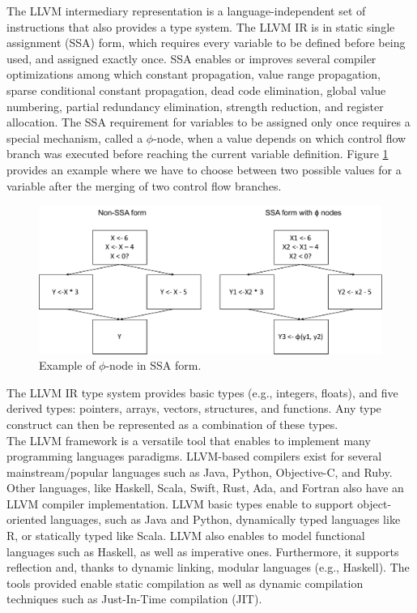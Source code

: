 The LLVM intermediary representation is a language-independent set of instructions that also provides a type system.
The LLVM IR is in static single assignment (SSA) form, which requires every variable to be defined before being used, and assigned exactly once. 
SSA enables or improves several compiler optimizations among which constant propagation, value range propagation, sparse conditional constant propagation, dead code elimination, global value numbering, partial redundancy elimination, strength reduction, and register allocation\cite{appel1998ssa}.
The SSA requirement for variables to be assigned only once requires a special mechanism, called a $\phi$-node, when a value depends on which control flow branch was executed before reaching the current variable definition.
Figure \ref{SSA example} provides an example where we have to choose between two possible values for a variable after the merging of two control flow branches.\\

\begin{figure}[h]
\centering
\includegraphics[scale=0.5]{Figures/SSAForm}
\decoRule
\caption[SSA example]{Example of $\phi$-node in SSA form.}
\label{SSA example}
\end{figure}

The LLVM IR type system provides basic types (e.g., integers, floats), and five derived types: pointers, arrays, vectors, structures, and functions.
Any type construct can then be represented as a combination of these types.\\

The LLVM framework is a versatile tool that enables to implement many programming languages paradigms.
LLVM-based compilers exist for several mainstream/popular languages such as Java, Python, Objective-C, and Ruby.
Other languages, like Haskell, Scala, Swift, Rust, Ada, and Fortran also have an LLVM compiler implementation.
LLVM basic types enable to support object-oriented languages, such as Java and Python, dynamically typed languages like R, or statically typed like Scala.
LLVM also enables to model functional languages such as Haskell, as well as imperative ones. 
Furthermore, it supports reflection and, thanks to dynamic linking, modular languages (e.g., Haskell).
The tools provided enable static compilation as well as dynamic compilation techniques such as Just-In-Time compilation (JIT).\\

